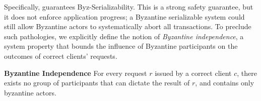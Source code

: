 %
%

Specifically, \sys{} guarantees Byz-Serializability.  This is a strong safety guarantee, but it does not enforce application progress; a Byzantine serializable system could still allow Byzantine actors to systematically abort all transactions. To preclude such pathologies, we explicitly define the notion of \textit{Byzantine independence}, a %
system property that bounds the influence of Byzantine participants on the outcomes of correct clients' requests.




 \par \textbf{Byzantine Independence} For every request $r$ issued by a correct client $c$, there exists no group of participants that can dictate the result of $r$, and contains only byzantine actors.

